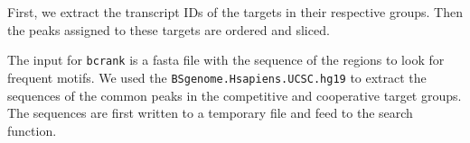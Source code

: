 \documentclass[9pt,a4paper,]{extarticle}
\newenvironment{Shaded}{\begin{snugshade}}{\end{snugshade}}
\newcommand{\AttributeTok}[1]{\textcolor[rgb]{0.77,0.63,0.00}{#1}}
\newcommand{\CommentTok}[1]{\textcolor[rgb]{0.56,0.35,0.01}{\textit{#1}}}
\newcommand{\ConstantTok}[1]{\textcolor[rgb]{0.00,0.00,0.00}{#1}}
\newcommand{\ControlFlowTok}[1]{\textcolor[rgb]{0.13,0.29,0.53}{\textbf{#1}}}
\newcommand{\DecValTok}[1]{\textcolor[rgb]{0.00,0.00,0.81}{#1}}
\newcommand{\FunctionTok}[1]{\textcolor[rgb]{0.00,0.00,0.00}{#1}}
\newcommand{\NormalTok}[1]{#1}
\newcommand{\OtherTok}[1]{\textcolor[rgb]{0.56,0.35,0.01}{#1}}
\newcommand{\SpecialCharTok}[1]{\textcolor[rgb]{0.00,0.00,0.00}{#1}}
\begin{document}
First, we extract the transcript IDs of the targets in their respective groups. Then the peaks assigned to these targets are ordered and sliced.

\begin{Shaded}
\end{Shaded}

The input for \texttt{bcrank} is a fasta file with the sequence of the regions to look for frequent motifs. We used the \texttt{BSgenome.Hsapiens.UCSC.hg19} to extract the sequences of the common peaks in the competitive and cooperative target groups. The sequences are first written to a temporary file and feed to the search function.
\end{document}
